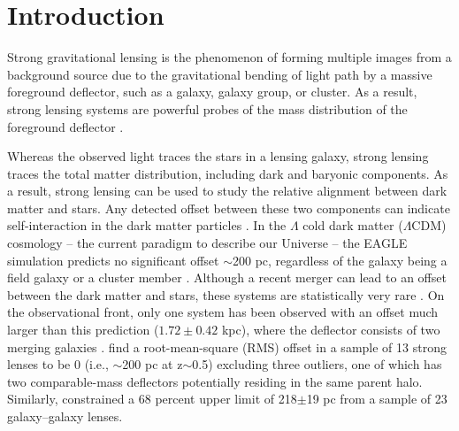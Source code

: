 \documentclass{aa}
\begin{document}

   \maketitle
%

\section{Introduction}

Strong gravitational lensing is the phenomenon of forming multiple images from a background source due to the gravitational bending of light path by a massive foreground deflector, such as a galaxy, galaxy group, or cluster. As a result, strong lensing systems are powerful probes of the mass distribution of the foreground deflector \citep[see][for a review on strong lensing by galaxies]{Shajib22}.

Whereas the observed light traces the stars in a lensing galaxy, strong lensing traces the total matter distribution, including dark and baryonic components. As a result, strong lensing can be used to study the relative alignment between dark matter and stars. Any detected offset between these two components can indicate self-interaction in the dark matter particles \citep{Harvey14, Kahlhoefer14, Robertson17}. In the $\Lambda$ cold dark matter ($\Lambda$CDM) cosmology -- the current paradigm to describe our Universe -- the EAGLE simulation predicts no significant offset $\sim$200 pc, regardless of the galaxy being a field galaxy or a cluster member \citep{Schaller15}. Although a recent merger can lead to an offset between the dark matter and stars, these systems are statistically very rare \citep{Schaller15}. On the observational front, only one system has been observed with an offset much larger than this prediction ($1.72\pm 0.42$ kpc), where the deflector consists of two merging galaxies  \citep[][]{Shu16}. %
\citet{Shajib19} find a root-mean-square (RMS) offset in a sample of 13 strong lenses to be 0 (i.e., $\sim$200 pc at z$\sim$0.5) excluding three outliers, one of which has two comparable-mass deflectors potentially residing in the same parent halo. Similarly, \citet{Shajib21} constrained a 68 percent upper limit of 218$\pm$19 pc from a sample of 23 galaxy--galaxy lenses.
\end{document}
